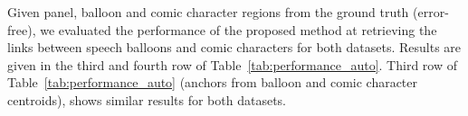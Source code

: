 \documentclass[conference]{IEEEtran}
\begin{document}
Given panel, balloon and comic character regions from the ground truth (error-free), we evaluated the performance of the proposed method at retrieving the links between speech balloons and comic characters for both datasets.
Results are given in the third and fourth row of Table~\ref{tab:performance_auto}.
Third row of Table~\ref{tab:performance_auto} (anchors from balloon and comic character centroids), shows similar results for both datasets.
\end{document}
